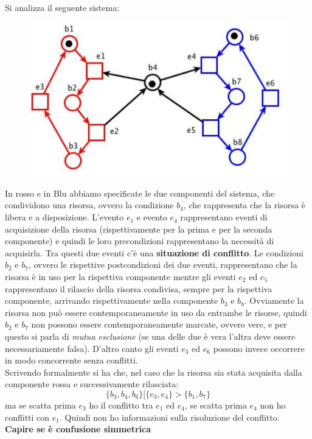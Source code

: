 \documentclass[a4paper,12pt, oneside]{book}
\begin{document}
\begin{esempio}
  Si analizza il seguente sistema:
  \begin{figure}[H]
    \centering
    \includegraphics[scale = 0.4]{img/mes.jpg} 
  \end{figure}
  In rosso e in Blu abbiamo specificate le due componenti del sistema, che
  condividono una risorsa, ovvero la condizione $b_4$, che rappresenta che la
  risorsa è libera e a disposizione. L'evento $e_1$ e evento $e_4$ rappresentano
  eventi di acquisizione della risorsa (rispettivamente per la prima e per la
  seconda componente) e quindi le loro precondizioni rappresentano la necessità
  di acquisirla. Tra questi due eventi c'è una \textbf{situazione di
    conflitto}. Le condizioni $b_2$ e $b_7$, ovvero le rispettive postcondizioni
  dei due eventi, rappresentano che la risorsa è in uso per la rispettiva
  componente mentre gli eventi $e_2$ ed $e_5$ rappresentano il rilascio della
  risorsa condivisa, sempre per la rispettiva componente, arrivando
  rispettivamente nella componente $b_3$ e $b_8$. Ovviamente la risorsa
  non può essere contemporaneamente in uso da entrambe le risorse, quindi $b_2$
  e $b_7$ non possono essere contemporaneamente marcate, ovvero vere, e per
  questo si parla di \textit{mutua esclusione} (se una delle due è vera l'altra
  deve essere necessariamente falsa). D'altro canto gli
  eventi $e_3$ ed $e_6$ possono invece occorrere in modo concorrente senza
  conflitti.\\
  Scrivendo formalmente si ha che, nel caso che la risorsa sia stata acquisita
  dalla componente rossa e successivamente rilasciata:
  \[\{b_3,b_4,b_6\}[\{e_3,e_4\}>\{b_1,b_7\}\]
  ma se scatta prima $e_3$ ho il conflitto tra $e_1$ ed $e_4$, se scatta prima
  $e_4$ non ho conflitti con $e_1$. Quindi non ho informazioni sulla risoluzione
  del conflitto.\\
  \textbf{Capire se è confusione simmetrica}
\end{esempio}
\end{document}
